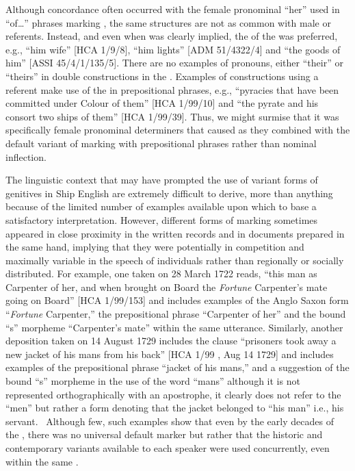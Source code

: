Although  concordance often occurred with the  female pronominal  “her” used in “of…” phrases marking , the same structures are not as common with male or  referents. Instead, and even when  was clearly implied, the  of the  was preferred, e.g., “him wife” [HCA 1/9/8], “him lights” [ADM 51/4322/4] and “the goods of him” [ASSI 45/4/1/135/5]. There are no examples of    pronouns, either “their” or “theirs” in double  constructions in the . Examples of constructions using a   referent make use of the  in prepositional phrases, e.g., “pyracies that have been committed under Colour of them” [HCA 1/99/10] and “the pyrate and his consort two ships of them” [HCA 1/99/39]. Thus, we might surmise that it was specifically female pronominal determiners that caused  as they combined with the default variant of marking  with prepositional phrases rather than nominal inflection. 

The linguistic context that may have prompted the use of variant forms of genitives in Ship English are extremely difficult to derive, more than anything because of the limited number of examples available upon which to base a satisfactory interpretation. However, different forms of marking  sometimes appeared in close proximity in the written records and in documents prepared in the same hand, implying that they were potentially in competition and maximally variable in the speech of individuals rather than regionally or socially distributed. For example, one  taken on 28 March {1722} reads, “this man as Carpenter of her, and when brought on Board the \textit{Fortune} Carpenter’s mate going on Board” [HCA 1/99/153] and includes examples of the Anglo Saxon  form “\textit{Fortune} Carpenter,” the prepositional  phrase “Carpenter of her” and the bound “s” morpheme “Carpenter’s mate” within the same utterance. Similarly, another deposition taken on 14 August {1729} includes the clause “prisoners took away a new jacket of his mans from his back” [HCA 1/99 , Aug 14 1729] and includes examples of the prepositional  phrase “jacket of his mans,” and a suggestion of the bound “s” morpheme in the use of the word “mans” although it is not represented orthographically with an apostrophe, it clearly does not refer to the  “men” but rather a  form denoting that the jacket belonged to “his man” i.e., his servant. ~Although few, such examples show that even by the early decades of the , there was no universal default  marker but rather that the historic and contemporary variants available to each speaker were used concurrently, even within the same . 

